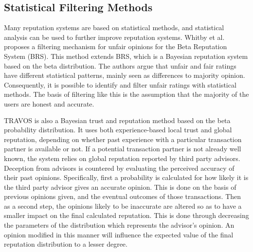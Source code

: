 \documentclass[%
    ]{\PathToTumTemplate/thesis/tum_thesis}
\begin{document}




\subsection{Statistical Filtering Methods}

Many reputation systems are based on statistical methods, and statistical analysis can be used to further improve reputation systems.
Whitby et al. proposes a filtering mechanism for unfair opinions for the Beta Reputation System (BRS)\cite{whitby_filtering_2014}.
This method extends BRS, which is a Bayesian reputation system based on the beta distribution.
The authors argue that unfair and fair ratings have different statistical patterns, mainly seen as differences to majority opinion.
Consequently, it is possible to identify and filter unfair ratings with statistical methods.
The basis of filtering like this is the assumption that the majority of the users are honest and accurate.

TRAVOS is also a Bayesian trust and reputation method based on the beta probability distribution\cite{teacy_travos_2006}.
It uses both experience-based local trust and global reputation, depending on whether past experience with a particular transaction partner is available or not.
If a potential transaction partner is not already well known, the system relies on global reputation reported by third party advisors.
Deception from advisors is countered by evaluating the perceived accuracy of their past opinions.
Specifically, first a probability is calculated for how likely it is the third party advisor gives an accurate opinion.
This is done on the basis of previous opinions given, and the eventual outcomes of those transactions.
Then as a second step, the opinions likely to be inaccurate are altered so as to have a smaller impact on the final calculated reputation.
This is done through decreasing the parameters of the distribution which represents the advisor's opinion. An opinion modified in this manner will influence the expected value of the final reputation distribution to a lesser degree.
\end{document}
